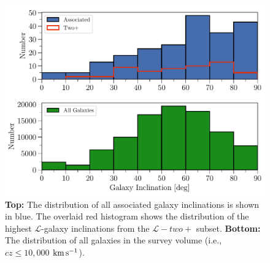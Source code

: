 \documentclass[twocolumn,tighten]{aastex62}
\newcommand{\kms}{$\rm km\, s^{-1}$}
\begin{document}
\begin{figure}[]
\centering
  \includegraphics[width=0.9\linewidth]{hist(adjustedInc)_associated_group_all_overlaid_double.pdf}
  \caption{\small{\textbf{Top:} The distribution of all associated galaxy inclinations is shown in blue. The overlaid red histogram shows the distribution of the highest $\mathcal{L}$-galaxy inclinations from the $\mathcal{L}-two+$ subset. \textbf{Bottom:} The distribution of all galaxies in the survey volume (i.e., $cz \leq 10,000$ \kms).}}
\label{inc_hist}
\vspace{0pt}
\end{figure}
\end{document}
